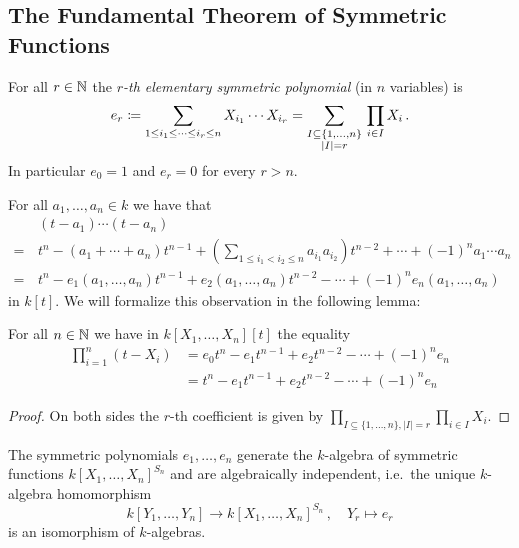 \subsection{The Fundamental Theorem of Symmetric Functions}


\begin{definition}
  For all $r \in \mathbb{N}$ the \emph{$r$-th elementary symmetric polynomial} (in $n$ variables) is
  \[
              e_r
    \coloneqq  \sum_{1 \leq i_1 \leq \dotsb \leq i_r \leq n} X_{i_1} \dotsm X_{i_r}
    =         \sum_{\substack{I \subseteq \{1, \dotsc, n\} \\ |I| = r}} \, \prod_{i \in I} X_i \,.
  \]
  In particular $e_0 = 1$ and $e_r = 0$ for every $r > n$.
\end{definition}


\begin{fluff}
  For all $a_1, \dotsc, a_n \in k$ we have that
  \begin{align*}
     &\, (t-a_1) \dotsm (t-a_n) \\
    =&\, t^n  - (a_1 + \dotsb + a_n) t^{n-1}
              + \left( \sum_{1 \leq i_1 < i_2 \leq n} a_{i_1} a_{i_2} \right) t^{n-2}
              + \dotsb
              + (-1)^n a_1 \dotsm a_n \\ 
    =&\,    t^n
          - e_1(a_1, \dotsc, a_n) t^{n-1}
          + e_2(a_1, \dotsc, a_n) t^{n-2}
          - \dotsb
          + (-1)^n e_n(a_1, \dotsc, a_n)
  \end{align*}
  in $k[t]$.
  We will formalize this observation in the following lemma:
\end{fluff}


\begin{lemma}
  \label{lemma: natural occurence of elementary symmetric polynomials}
  For all $n \in \mathbb{N}$ we have in $k[X_1, \dotsc, X_n][t]$ the equality
  \begin{align*}
        \prod_{i=1}^n (t-X_i)
    &=    e_0 t^n
        - e_1 t^{n-1}
        + e_2 t^{n-2}
        - \dotsb
        + (-1)^n e_n  \\
    &=    t^n
        - e_1 t^{n-1}
        + e_2 t^{n-2}
        - \dotsb
        + (-1)^n e_n
  \end{align*}
\end{lemma}
\begin{proof}
  On both sides the $r$-th coefficient is given by $\prod_{I \subseteq \{1, \dotsc, n\}, |I| = r} \prod_{i \in I} X_i $.
\end{proof}


\begin{theorem}
  \label{theorem: fundamental theorem of symmetric functions}
  The symmetric polynomials $e_1, \dotsc, e_n$ generate the $k$-algebra of symmetric functions $k[X_1, \dotsc, X_n]^{S_n}$ and are algebraically independent, i.e.\ the unique $k$-algebra homomorphism
  \[
            k[Y_1, \dotsc, Y_n]
    \to     k[X_1, \dotsc, X_n]^{S_n} \,,
    \quad   Y_r
    \mapsto e_r
  \]
  is an isomorphism of $k$-algebras.
\end{theorem}


